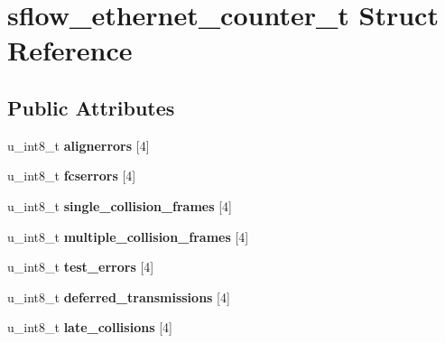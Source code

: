 \hypertarget{structsflow__ethernet__counter__t}{
\section{sflow\_\-ethernet\_\-counter\_\-t Struct Reference}
\label{structsflow__ethernet__counter__t}
}
\subsection*{Public Attributes}
\begin{DoxyCompactItemize}
\item 
\hypertarget{structsflow__ethernet__counter__t_a300c3ebd97b67556596c9c315e670ef1}{
u\_\-int8\_\-t {\bfseries alignerrors} \mbox{[}4\mbox{]}}
\label{structsflow__ethernet__counter__t_a300c3ebd97b67556596c9c315e670ef1}

\item 
\hypertarget{structsflow__ethernet__counter__t_a986a6b42d18fa9d2469c4f00c0868c3c}{
u\_\-int8\_\-t {\bfseries fcserrors} \mbox{[}4\mbox{]}}
\label{structsflow__ethernet__counter__t_a986a6b42d18fa9d2469c4f00c0868c3c}

\item 
\hypertarget{structsflow__ethernet__counter__t_a7f23496dbcc89c3a83b4abe2e65ed515}{
u\_\-int8\_\-t {\bfseries single\_\-collision\_\-frames} \mbox{[}4\mbox{]}}
\label{structsflow__ethernet__counter__t_a7f23496dbcc89c3a83b4abe2e65ed515}

\item 
\hypertarget{structsflow__ethernet__counter__t_a540a2bda49af559dcbdedc2a198ef61f}{
u\_\-int8\_\-t {\bfseries multiple\_\-collision\_\-frames} \mbox{[}4\mbox{]}}
\label{structsflow__ethernet__counter__t_a540a2bda49af559dcbdedc2a198ef61f}

\item 
\hypertarget{structsflow__ethernet__counter__t_a2a43cadd6dca49779ee97aef36968fa6}{
u\_\-int8\_\-t {\bfseries test\_\-errors} \mbox{[}4\mbox{]}}
\label{structsflow__ethernet__counter__t_a2a43cadd6dca49779ee97aef36968fa6}

\item 
\hypertarget{structsflow__ethernet__counter__t_a06d5fb3cdb5f3b5b45f6b77cfda63836}{
u\_\-int8\_\-t {\bfseries deferred\_\-transmissions} \mbox{[}4\mbox{]}}
\label{structsflow__ethernet__counter__t_a06d5fb3cdb5f3b5b45f6b77cfda63836}

\item 
\hypertarget{structsflow__ethernet__counter__t_a0e20558df2b0ee0163768159efa79c30}{
u\_\-int8\_\-t {\bfseries late\_\-collisions} \mbox{[}4\mbox{]}}
\label{structsflow__ethernet__counter__t_a0e20558df2b0ee0163768159efa79c30}


\end{DoxyCompactItemize}
